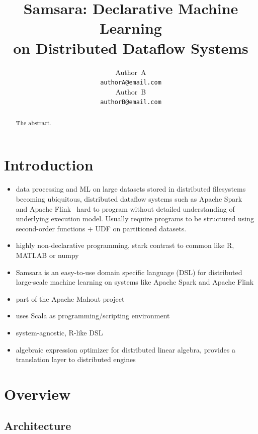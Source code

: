 \documentclass{article}
\title{Samsara: Declarative Machine Learning\\ on Distributed Dataflow Systems}
\author{
  Author~A\\
  \texttt{authorA@email.com} \\
  \And
  Author~B\\
  \texttt{authorB@email.com} \\
}
\begin{document}

\maketitle

\begin{abstract}
  The abstract.
\end{abstract}

\section{Introduction}

\begin{itemize}[noitemsep]
  \item data processing and ML on large datasets stored in distributed filesystems becoming ubiquitous, distributed dataflow systems such as Apache Spark~\cite{Zaharia2012} and Apache Flink~\cite{Alexandrov2014} hard to program without detailed understanding of underlying execution model. Usually require programs to be structured using second-order functions + UDF on partitioned datasets.
  \item highly non-declarative programming, stark contrast to common like R, MATLAB or numpy
\end{itemize}

\begin{itemize}[noitemsep]  
  \item Samsara is an easy-to-use domain specific language (DSL) for distributed large-scale machine learning on systems like Apache Spark and Apache Flink
  \item part of the Apache Mahout project
  \item uses Scala as programming/scripting environment
  \item system-agnostic, R-like DSL
  \item algebraic expression optimizer for distributed linear algebra, provides a translation layer to distributed engines
\end{itemize}

\section{Overview}

\subsection{Architecture}
\end{document}
